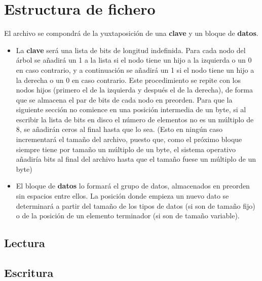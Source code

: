 \documentclass{article}
\begin{document}
\section{Estructura de fichero}

El archivo se compondrá de la yuxtaposición de una \textbf{clave} y un
bloque de \textbf{datos}.

\begin{itemize}
	\item La \textbf{clave} será una lista de bits de longitud indefinida.
  Para cada nodo del árbol se añadirá un 1 a la lista si el nodo tiene un hijo a
  la izquierda o un 0 en caso contrario, y a continuación se añadirá un 1 si el
  nodo tiene un hijo a la derecha o un 0 en caso contrario. Este procedimiento
  se repite con los nodos hijos (primero el de la izquierda y después el de la
  derecha), de forma que se almacena el par de bits de cada nodo en preorden.
  Para que la siguiente sección no comience en una posición intermedia de un byte,
  si al escribir la lista de bits en disco el número de elementos no es un múltiplo
  de 8, se añadirán ceros al final hasta que lo sea. (Esto en ningún caso
  incrementará el tamaño del archivo, puesto que, como el próximo bloque siempre
  tiene por tamaño un múltiplo de un byte, el sistema operativo añadiría bits al
  final del archivo hasta que el tamaño fuese un múltiplo de un byte)
	\item El bloque de \textbf{datos} lo formará el grupo de datos, almacenados
  en preorden sin espacios entre ellos. La posición donde empieza un nuevo dato
  se determinará a partir del tamaño de los tipos de datos (si son de tamaño fijo)
  o de la posición de un elemento terminador (si son de tamaño variable).
\end{itemize}

\subsection{Lectura}

\subsection{Escritura}
\end{document}
